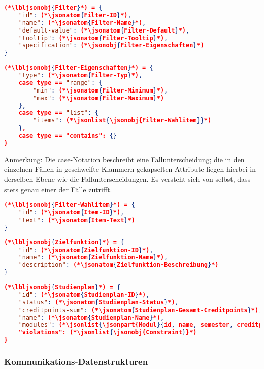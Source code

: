 \begin{lstlisting}[language=json]
(*\lbljsonobj{Filter}*) = {
	"id": (*\jsonatom{Filter-ID}*),
	"name": (*\jsonatom{Filter-Name}*),
	"default-value": (*\jsonatom{Filter-Default}*),
	"tooltip": (*\jsonatom{Filter-Tooltip}*),
	"specification": (*\jsonobj{Filter-Eigenschaften}*)
}
\end{lstlisting}

\begin{lstlisting}[language=json]
(*\lbljsonobj{Filter-Eigenschaften}*) = {
	"type": (*\jsonatom{Filter-Typ}*),
	case type == "range": {
		"min": (*\jsonatom{Filter-Minimum}*),
		"max": (*\jsonatom{Filter-Maximum}*)
	},
	case type == "list": {
		"items": (*\jsonlist{\jsonobj{Filter-Wahlitem}}*)
	},
	case type == "contains": {}
}
\end{lstlisting}
\vspace{-\baselineskip}
Anmerkung: Die case-Notation beschreibt eine Fallunterscheidung; die in den einzelnen Fällen in geschweifte Klammern gekapselten Attribute liegen hierbei in derselben Ebene wie die Fallunterscheidungen. Es versteht sich von selbst, dass stets genau einer der Fälle zutrifft.
\vspace{\baselineskip}

\begin{lstlisting}[language=json]
(*\lbljsonobj{Filter-Wahlitem}*) = {
	"id": (*\jsonatom{Item-ID}*),
	"text": (*\jsonatom{Item-Text}*)
}
\end{lstlisting}

\begin{lstlisting}[language=json]
(*\lbljsonobj{Zielfunktion}*) = {
	"id": (*\jsonatom{Zielfunktion-ID}*),
	"name": (*\jsonatom{Zielfunktion-Name}*),
	"description": (*\jsonatom{Zielfunktion-Beschreibung}*)
}
\end{lstlisting}

\begin{lstlisting}[language=json]
(*\lbljsonobj{Studienplan}*) = {
    "id": (*\jsonatom{Studienplan-ID}*),
    "status": (*\jsonatom{Studienplan-Status}*),
    "creditpoints-sum": (*\jsonatom{Studienplan-Gesamt-Creditpoints}*),
    "name": (*\jsonatom{Studienplan-Name}*),
    "modules": (*\jsonlist{\jsonpart{Modul}{id, name, semester, creditpoints, lecturer}}*),
    "violations": (*\jsonlist{\jsonobj{Constraint}}*)	
}
\end{lstlisting}

\subsubsection*{Kommunikations-Datenstrukturen}

